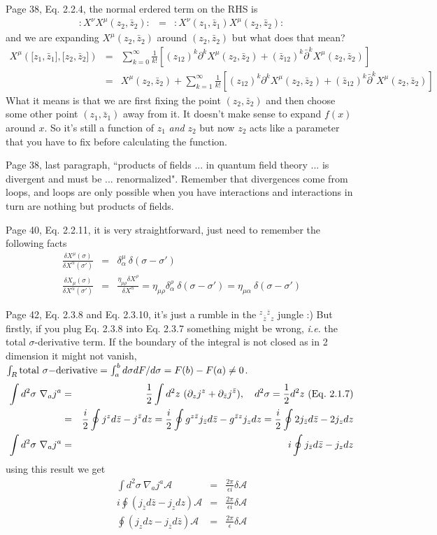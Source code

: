 \documentclass[aps,preprint,preprintnumbers,nofootinbib,showpacs,prd]{revtex4-1}
\newcommand{\ie}{{\it i.e.} }
\newcommand{\nbea}{\begin{eqnarray*}}
\newcommand{\neea}{\end{eqnarray*}}
\begin{document}
Page 38, Eq. 2.2.4, the normal erdered term on the RHS is
%
\nbea
:X^\nu X^\mu(z_2,\bar z_2): & = & :X^\nu (z_1,\bar z_1) X^\mu(z_2,\bar z_2):
\neea
%
and we are expanding $X^\mu(z_2,\bar z_2)$ around $(z_2,\bar z_2)$ but what does that mean?
%
\nbea
X^\mu(\lbrack z_1,\bar z_1 \rbrack, \lbrack z_2,\bar z_2 \rbrack ) & = & \sum_{k = 0}^{\infty} \frac{1}{k!} \left \lbrack (z_{12})^k \partial^k X^\mu(z_2,\bar z_2) + (\bar z_{12})^k \bar \partial^k X^\mu(z_2,\bar z_2) \right \rbrack \\
& = & X^\mu(z_2,\bar z_2) + \sum_{k = 1}^{\infty} \frac{1}{k!} \left \lbrack (z_{12})^k \partial^k X^\mu(z_2,\bar z_2) + (\bar z_{12})^k \bar \partial^k X^\mu(z_2,\bar z_2) \right \rbrack
\neea
%
What it means is that we are first fixing the point $( z_2,\bar z_2 )$ and then choose some other point $( z_1,\bar z_1 )$ away from it. It doesn't make sense to expand $f(x)$ around $x$. So it's still a function of $z_1$ {\it and} $z_2$ but now $z_2$ acts like a parameter that you have to fix before calculating the function.

Page 38, last paragraph, ``products of fields ... in quantum field theory ... is divergent and must be ... renormalized". Remember that divergences come from loops, and loops are only possible when you have interactions and interactions in turn are nothing but products of fields.

Page 40, Eq. 2.2.11, it is very straightforward, just need to remember the following facts
%
\nbea
\frac{\delta X^\mu (\sigma) }{\delta X^\alpha(\sigma') } & = & \delta^\mu_\alpha ~ \delta(\sigma - \sigma')\\
\frac{\delta X_\mu(\sigma) }{\delta X^\alpha(\sigma') } & = & \frac{\eta_{\mu\rho} \delta X^\rho }{\delta X^\alpha} = \eta_{\mu\rho} \delta^\rho_\alpha ~ \delta(\sigma - \sigma') = \eta_{\mu\alpha}  ~ \delta(\sigma - \sigma')
\neea
%

Page 42, Eq. 2.3.8 and Eq. 2.3.10, it's just a rumble in the ${}^z {}_{\bar z} {}^{\bar z} {}_z$ jungle :) But firstly, if you plug Eq. 2.3.8 into Eq. 2.3.7 something might be wrong, \ie the total $\sigma$-derivative term. If the boundary of the integral is not closed as in 2 dimension it might not vanish, $\int_R {\rm total~}\sigma{\rm-derivative} = \int_a^b d\sigma dF/d\sigma = F(b) - F(a) \neq 0$.
%
\nbea
\int d^2\sigma~\nabla_a j^a & = & \frac{1}{2} \int d^2z~(\partial_z j^z + \partial_{\bar z} j^{\bar z}), ~~~ d^2\sigma = \frac{1}{2} d^2z {~\rm (Eq.~2.1.7)}\\
& = & \frac{i}{2} \oint j^z d \bar z - j^{\bar z} dz = \frac{i}{2} \oint g^{z \bar z}j_{\bar z} d \bar z - g^{\bar z z}j_{z} dz = \frac{i}{2} \oint 2 j_{\bar z} d \bar z - 2 j_{z} dz \\
\int d^2\sigma~\nabla_a j^a & = & i \oint j_{\bar z} d \bar z - j_{z} dz 
\neea
%
using this result we get
%
\nbea
\int d^2\sigma~\nabla_a j^a \mathcal{A} & = & \frac{2\pi}{\epsilon i} \delta \mathcal{A} \\
i \oint ( j_{\bar z} d \bar z - j_{z} dz ) \mathcal{A} & = & \frac{2\pi}{\epsilon i} \delta \mathcal{A} \\
\oint ( j_{z} dz - j_{\bar z} d \bar z ) \mathcal{A} & = & \frac{2\pi}{\epsilon} \delta \mathcal{A}
\neea
%
\end{document}
